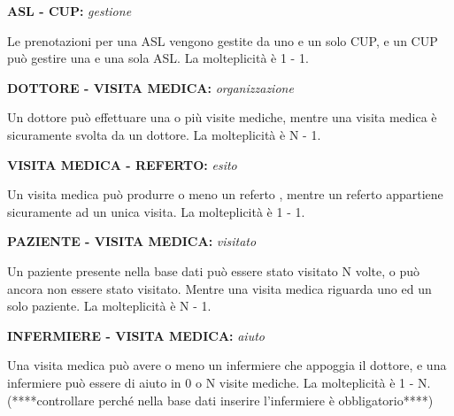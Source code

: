 \documentclass{report}
\begin{document}
\begin{center}
\textbf{ASL - CUP:} \textit{gestione}
\end{center} 
Le prenotazioni per una ASL  vengono gestite da uno e un solo CUP, e un CUP può gestire una e una sola ASL. La molteplicità è 1 - 1.


\begin{center}
\textbf{DOTTORE - VISITA MEDICA:} \textit{organizzazione}
\end{center} 
Un dottore può effettuare una o più visite mediche, mentre una visita medica è sicuramente svolta da un dottore. La molteplicità è N - 1.


\begin{center}
\textbf{VISITA MEDICA - REFERTO:} \textit{esito}
\end{center} 
Un visita medica può produrre o meno un referto , mentre un referto appartiene sicuramente ad un unica visita. La molteplicità è 1 - 1.


\begin{center}
\textbf{PAZIENTE - VISITA MEDICA:} \textit{visitato}
\end{center} 
Un paziente presente nella base dati può essere stato visitato N volte, o può ancora non essere stato visitato. 	Mentre una visita medica riguarda uno ed un solo paziente. La molteplicità è N - 1.


\begin{center}
\textbf{INFERMIERE - VISITA MEDICA:} \textit{aiuto}
\end{center} 
Una visita medica può avere o meno un infermiere che appoggia il dottore, e una infermiere può essere di aiuto in 0 o N visite mediche. La molteplicità è 1 - N.  (****controllare perché nella base dati inserire l'infermiere è obbligatorio****)
\end{document}
